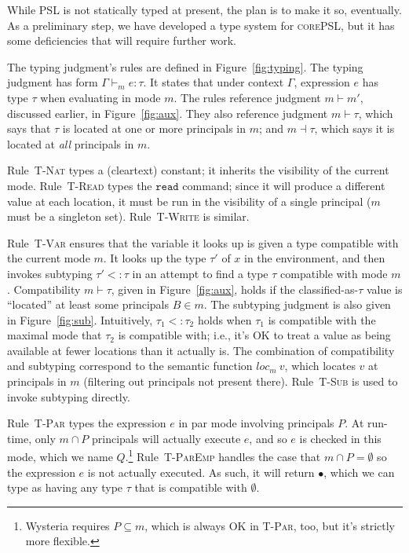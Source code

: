 \documentclass[10pt]{article}
\newcommand{\rulelab}[1]{{\small \textsc{#1}}}
\newcommand{\kw}[1]{\ensuremath{\mathtt{#1}}}
\newcommand{\vcrash}{\ensuremath{\bullet}}
\newcommand{\hastyp}[4]{\ensuremath{{#1} \vdash_{#2} {#3} : {#4}}}
\newcommand{\subtype}{\ensuremath{<:}}
\newcommand{\issub}[2]{{#1} \subtype {#2}}
\newcommand{\locof}[2]{\ensuremath{\mathit{loc}_{#1}~{#2}}}
\newcommand{\lang}{\textsc{corePSL}\xspace}
\begin{document}
While PSL is not statically typed at present, the plan is to make it
so, eventually. As a preliminary step, we have developed a type system
for \lang, but it has some deficiencies that will require further work.

The typing judgment's rules are defined in Figure~\ref{fig:typing}.
The typing judgment has form $\hastyp{\Gamma}{m}{e}{\tau}$. It states
that under context $\Gamma$, expression $e$ has type $\tau$ when
evaluating in mode $m$. The rules reference judgment $m \vdash m'$,
discussed earlier, in Figure~\ref{fig:aux}. They also reference
judgment $m \vdash \tau$, which says that $\tau$ is located at 
one or more principals in $m$; and $m \dashv \tau$, which says it is
located at \emph{all} principals in $m$. 

Rule~\rulelab{T-Nat} types a (cleartext) constant; it inherits the
visibility of the current mode. Rule~\rulelab{T-Read} types the
\kw{read} command; since it will produce a different value at each
location, it must be run in the visibility of a single principal ($m$
must be a singleton set). Rule~\rulelab{T-Write} is
similar.

Rule~\rulelab{T-Var} ensures that the variable it looks up is given a
type compatible with the current mode $m$. It looks up the type
$\tau'$ of $x$ in the environment, and then invokes subtyping
$\issub{\tau'}{\tau}$ in an attempt to find a type $\tau$ compatible
with mode $m$. Compatibility $m \vdash \tau$, given in
Figure~\ref{fig:aux}, holds if the classified-as-$\tau$ value is
``located'' at least some principals $B \in m$. The subtyping judgment
is also given in Figure~\ref{fig:sub}. Intuitively,
$\issub{\tau_1}{\tau_2}$ holds when $\tau_1$ is compatible with the
maximal mode that $\tau_2$ is compatible with; i.e., it's OK to treat
a value as being available at fewer locations than it actually is. The
combination of compatibility and subtyping correspond to the semantic
function $\locof{m}{v}$, which locates $v$ at principals in $m$
(filtering out principals not present there). Rule~\rulelab{T-Sub} is
used to invoke subtyping directly.

Rule~\rulelab{T-Par} types the expression $e$ in par mode involving
principals $P$. At run-time, only $m \cap P$ principals will actually
execute $e$, and so $e$ is checked in this mode, which we name
$Q$.\footnote{Wysteria requires $P \subseteq m$, which is always OK in
  \rulelab{T-Par}, too, but it's strictly more flexible.}
Rule~\rulelab{T-ParEmp} handles the case that $m \cap P = \emptyset$
so the expression $e$ is not actually executed. As such, it will
return $\vcrash$, which we can type as having any type $\tau$ that is
compatible with $\emptyset$.
\end{document}
